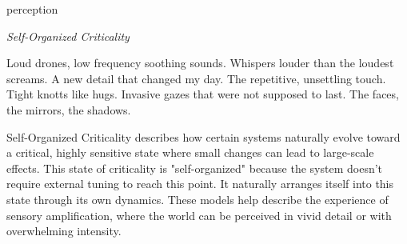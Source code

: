 

\begin{center}
\vspace*{\fill}
\Huge{perception}

\vspace{2cm}

\begin{flushright}
\large{
\textit{Self-Organized Criticality}}
\end{flushright}

\vspace*{\fill}
\end{center}

Loud drones, low frequency soothing sounds.
Whispers louder than the loudest screams. 
A new detail that changed my day. 
The repetitive, unsettling  touch.
Tight knotts like hugs. 
Invasive gazes that were not supposed to last.
The faces, the mirrors, the shadows. 


Self-Organized Criticality describes how certain systems naturally evolve toward a critical, highly sensitive state where small changes can lead to large-scale effects. This state of criticality is "self-organized" because the system doesn’t require external tuning to reach this point. It naturally arranges itself into this state through its own dynamics. These models help describe the experience of sensory amplification, where the world can be perceived in vivid detail or with overwhelming intensity. 